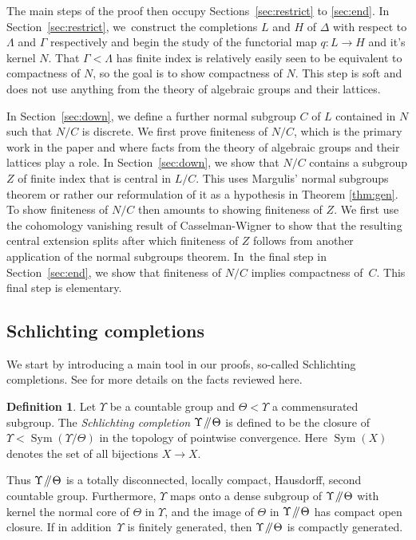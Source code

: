 \documentclass[JEP,XML,SOM,Unicode,published]{cedram}
\newcommand{\Y}{\ensuremath{\Upsilon}}
\newcommand{\sslash}{\mathbin{\mkern-3mu /\mkern-5mu/ \mkern-3mu}}
\DeclareMathOperator{\Sym}{Sym}
\theoremstyle{definition}
\newtheorem{dfn}[thm]{Definition}
\begin{document}
The main steps of the proof then occupy Sections~\ref{sec:restrict} to \ref{sec:end}. In Section~\ref{sec:restrict}, we~construct the completions $L$ and $H$ of $\Delta$ with respect to
$\Lambda$ and $\Gamma$ respectively and begin the study of the functorial map $q:L \to H$ and it's kernel $N$. That $\Gamma < \Lambda$ has finite index is relatively easily seen to be equivalent to compactness of $N$, so the goal is to show compactness of $N$. This step is soft and does not use
anything from the theory of algebraic groups and their lattices.

In Section~\ref{sec:down}, we define a further normal subgroup $C$ of $L$ contained in $N$ such that $N/C$ is discrete. We first prove finiteness of $N/C$, which is the primary work in the paper
and where facts from the theory of algebraic groups and their lattices play a role. In Section~\ref{sec:down}, we show that $N/C$ contains a subgroup $Z$ of finite index that is central in $L/C$.
This uses Margulis' normal subgroups theorem or rather our reformulation of it as a hypothesis in Theorem \ref{thm:gen}. To show finiteness of $N/C$ then amounts to showing finiteness of $Z$. We first use the cohomology vanishing result of Casselman-Wigner to show that the resulting central extension splits after which finiteness of $Z$ follows from another application of the normal subgroups theorem.
In~the final step in Section~\ref{sec:end}, we show that finiteness of $N/C$ implies compactness of~$C$. This final step is elementary.

\subsection{Schlichting completions}\label{sec:schlichting-def}
We start by introducing a main tool in our proofs, so-called Schlichting completions. See \cite[\S 3]{shalom-willis} for more details on the facts reviewed here.

\begin{dfn} Let $\Y$ be a countable group and $\Theta<\Y$ a commensurated subgroup. The \emph{Schlichting completion} $\Y\sslash\Theta$ is defined to be the closure of $\Y<\Sym(\Y/\Theta)$ in the topology of pointwise convergence. Here $\Sym(X)$ denotes the set of all bijections $X\to X$.\end{dfn}

Thus $\Y\sslash\Theta$ is a totally disconnected, locally compact, Hausdorff, second countable group. Furthermore, $\Y$ maps onto a dense subgroup of $\Y\sslash\Theta$ with kernel the normal core of $\Theta$ in $\Y$, and the image of $\Theta$ in $\Y\sslash\Theta$ has compact open closure. If in addition~$\Y$ is finitely generated, then $\Y\sslash\Theta$ is compactly generated.
\end{document}
